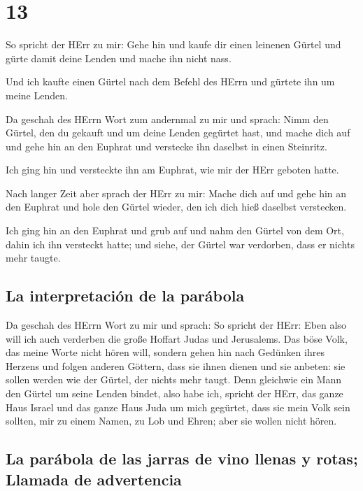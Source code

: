 \hypertarget{section-12}{%
\section{13}\label{section-12}}

 So spricht der HErr zu mir: Gehe hin und kaufe dir einen
leinenen Gürtel und gürte damit deine Lenden und mache ihn nicht nass.

 Und ich kaufte einen Gürtel nach dem Befehl des HErrn und
gürtete ihn um meine Lenden.

 Da geschah des HErrn Wort zum andernmal zu mir und
sprach:  Nimm den Gürtel, den du gekauft und um deine
Lenden gegürtet hast, und mache dich auf und gehe hin an den Euphrat und
verstecke ihn daselbst in einen Steinritz.

 Ich ging hin und versteckte ihn am Euphrat, wie mir der
HErr geboten hatte.

 Nach langer Zeit aber sprach der HErr zu mir: Mache dich
auf und gehe hin an den Euphrat und hole den Gürtel wieder, den ich dich
hieß daselbst verstecken.

 Ich ging hin an den Euphrat und grub auf und nahm den
Gürtel von dem Ort, dahin ich ihn versteckt hatte; und siehe, der Gürtel
war verdorben, dass er nichts mehr taugte.

\hypertarget{la-interpretaciuxf3n-de-la-paruxe1bola}{%
\subsection{La interpretación de la
parábola}\label{la-interpretaciuxf3n-de-la-paruxe1bola}}

 Da geschah des HErrn Wort zu mir und sprach:
 So spricht der HErr: Eben also will ich auch verderben
die große Hoffart Judas und Jerusalems.  Das böse Volk,
das meine Worte nicht hören will, sondern gehen hin nach Gedünken ihres
Herzens und folgen anderen Göttern, dass sie ihnen dienen und sie
anbeten: sie sollen werden wie der Gürtel, der nichts mehr taugt.
 Denn gleichwie ein Mann den Gürtel um seine Lenden
bindet, also habe ich, spricht der HErr, das ganze Haus Israel und das
ganze Haus Juda um mich gegürtet, dass sie mein Volk sein sollten, mir
zu einem Namen, zu Lob und Ehren; aber sie wollen nicht hören.

\hypertarget{la-paruxe1bola-de-las-jarras-de-vino-llenas-y-rotas-llamada-de-advertencia}{%
\subsection{La parábola de las jarras de vino llenas y rotas; Llamada de
advertencia}\label{la-paruxe1bola-de-las-jarras-de-vino-llenas-y-rotas-llamada-de-advertencia}}

